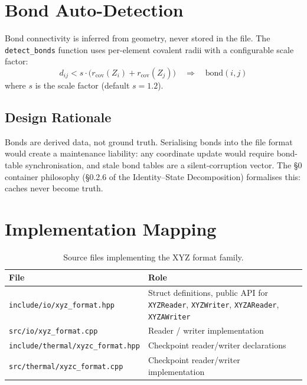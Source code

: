 \documentclass[12pt, a4paper, oneside]{article}
\newcommand{\file}[1]{\texttt{#1}}
\newcommand{\type}[1]{\texttt{#1}}
\begin{document}
\section{Bond Auto-Detection}
\label{sec:bonds}

Bond connectivity is inferred from geometry, never stored in the file.
The \texttt{detect\_bonds} function uses per-element covalent radii
with a configurable scale factor:
\begin{equation}
  d_{ij} < s \cdot \bigl(r_{\text{cov}}(Z_i) + r_{\text{cov}}(Z_j)\bigr)
  \quad \Longrightarrow \quad \text{bond}(i, j)
  \label{eq:bond}
\end{equation}
where $s$ is the scale factor (default $s = 1.2$).

\subsection{Design Rationale}

Bonds are derived data, not ground truth.  Serialising bonds into
the file format would create a maintenance liability: any coordinate
update would require bond-table synchronisation, and stale bond
tables are a silent-corruption vector.  The \S0 container philosophy
(§0.2.6 of the Identity--State Decomposition) formalises this:
caches never become truth.

\section{Implementation Mapping}
\label{sec:impl}

\begin{table}[htbp]
  \centering
  \caption{Source files implementing the XYZ format family.}
  \label{tab:impl}
  \begin{tabular}{lp{8.5cm}}
    \toprule
    File & Role \\
    \midrule
    \file{include/io/xyz\_format.hpp}
      & Struct definitions, public API for \type{XYZReader},
        \type{XYZWriter}, \type{XYZAReader}, \type{XYZAWriter} \\
    \file{src/io/xyz\_format.cpp}
      & Reader / writer implementation \\
    \file{include/thermal/xyzc\_format.hpp}
      & Checkpoint reader/writer declarations \\
    \file{src/thermal/xyzc\_format.cpp}
      & Checkpoint reader/writer implementation \\
    \bottomrule
  \end{tabular}
\end{table}
\end{document}
